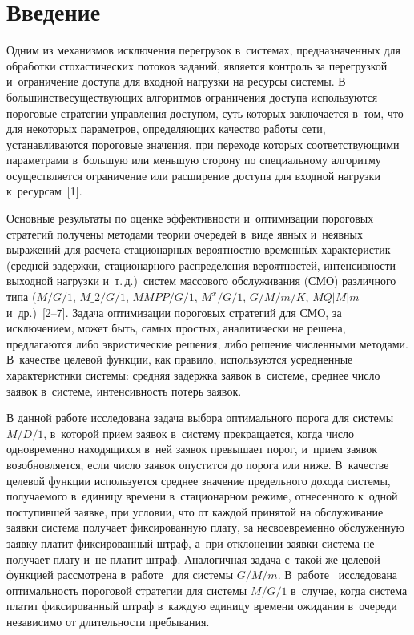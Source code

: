 \begin{multicols}{2}

\label{st\stat}

\section{Введение}

  Одним из механизмов исключения перегрузок в~системах, предназначенных
для обработки стохастических потоков заданий, является контроль за
перегрузкой и~ограничение доступа для входной нагрузки на ресурсы системы.
В большинстве\linebreak существу\-ющих алгоритмов ограничения доступа используются
пороговые стратегии управления доступом, суть которых заключается в~том,
что для некоторых параметров, определяющих качество работы сети,
устанавливаются пороговые значения, при переходе которых
соответствующими параметрами в~большую или меньшую сторону по
специальному алгоритму осуществляется ограничение или расширение доступа
для входной нагрузки к~ресурсам~[1].

  Основные результаты по оценке эффектив\-ности и~оптимизации пороговых
стратегий получены ме\-то\-да\-ми теории очередей в~виде явных и~\mbox{неявных}
выражений для расчета стационарных
  ве\-ро\-ят\-но\-ст\-но-вре\-мен\-н$\acute{\mbox{ы}}$х характеристик (средней
задержки, стационарного распределения вероятностей, интенсивности
выходной нагрузки и~т.\,д.)\ систем массового обслуживания (СМО) различного типа ($M/G/1$, $M\_2/G/1$,
$MMPP/G/1$, $M^x/G/1$, $G/M/m/K$, $MQ|M|m$ и~др.)~[2--7]. Задача
оптимизации пороговых стратегий для СМО, за исключением, может быть,
самых простых, аналитически не решена, предлагаются либо эвристические
решения, либо решение численными методами. В~качестве целевой функции,
как правило, используются усредненные характеристики системы: средняя
задержка заявок в~системе, среднее число заявок в~системе, интенсивность
потерь заявок.

  В данной работе исследована задача выбора оптимального порога для
системы $M/D/1$, в~которой прием заявок в~систему прекращается, когда число
одновременно находящихся в~ней заявок превышает порог, и~прием заявок
возобновляется, если число заявок опустится до порога или ниже. В~качестве
целевой функции используется среднее значение предельного дохода системы,
получаемого в~единицу времени в~стационарном режиме, отнесенного к~одной
поступившей заявке, при условии, что от каждой принятой на обслуживание
заявки система получает фиксированную плату, за несвоевременно
обслуженную заявку платит фиксированный штраф, а~при отклонении заявки
система не получает плату и~не платит штраф. Аналогичная задача с~такой же
целевой функцией рассмотрена в~работе~\cite{4-aga} для системы $G/M/m$.
В~работе~\cite{6-aga} исследована оптимальность пороговой стратегии для
системы $M/G/1$ в~случае, когда система платит фиксированный штраф в~каждую единицу времени ожидания в~очереди независимо от длительности
пребывания.


\end{multicols}
